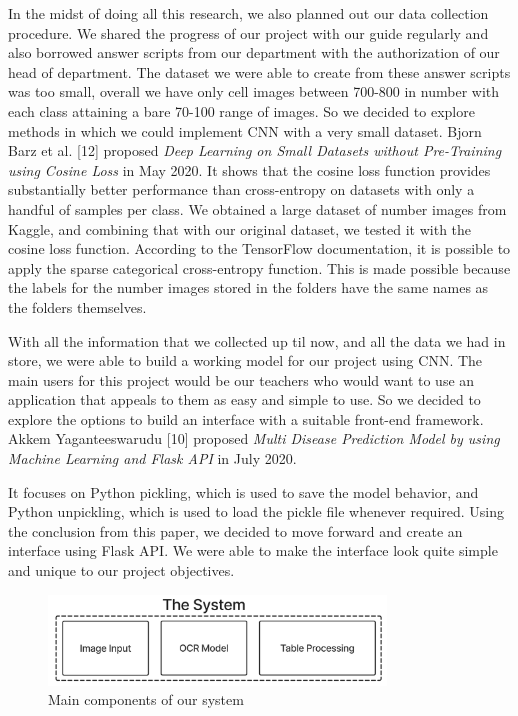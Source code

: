 \noindent
In the midst of doing all this research, we also planned out our data collection procedure. We shared the progress of our project with our guide regularly and also borrowed answer scripts from our department with the authorization of our head of department. The dataset we were able to create from these answer scripts was too small, overall we have only cell images between 700-800 in number with each class attaining a bare 70-100 range of images. So we decided to explore methods in which we could implement CNN with a very small dataset. Bjorn Barz et al. [12] proposed {\it Deep Learning on Small Datasets without Pre-Training using Cosine Loss} in May 2020. It shows that the cosine loss function provides substantially better performance than cross-entropy on datasets with only a handful of samples per class. We obtained a large dataset of number images from Kaggle, and combining that with our original dataset, we tested it with the cosine loss function. According to the TensorFlow documentation, it is possible to apply the sparse categorical cross-entropy function. This is made possible because the labels for the number images stored in the folders have the same names as the folders themselves.

\noindent
With all the information that we collected up til now, and all the data we had in store, we were able to build a working model for our project using CNN. The main users for this project would be our teachers who would want to use an application that appeals to them as easy and simple to use. So we decided to explore the options to build an interface with a suitable front-end framework. Akkem Yaganteeswarudu [10] proposed {\it Multi Disease Prediction Model by using Machine Learning and Flask API} in July 2020. 

\clearpage

\noindent
It focuses on Python pickling, which is used to save the model behavior, and Python unpickling, which is used to load the pickle file whenever required. Using the conclusion from this paper, we decided to move forward and create an interface using Flask API. We were able to make the interface look quite simple and unique to our project objectives.

\begin{figure}[h!]
    \centering
    \includegraphics[width=0.8\textwidth]{Images/lit_review/main_components_of_MP.jpg}
    \caption{Main components of our system}
\end{figure}

